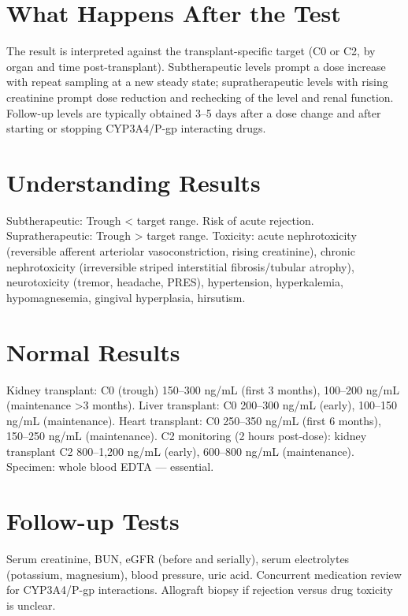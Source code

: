 \section*{What Happens After the Test}
The result is interpreted against the transplant-specific target (C0 or C2, by organ and time post-transplant). Subtherapeutic levels prompt a dose increase with repeat sampling at a new steady state; supratherapeutic levels with rising creatinine prompt dose reduction and rechecking of the level and renal function. Follow-up levels are typically obtained 3--5 days after a dose change and after starting or stopping CYP3A4/P-gp interacting drugs.

\section*{Understanding Results}
Subtherapeutic: Trough < target range. Risk of acute rejection. Supratherapeutic: Trough > target range. Toxicity: acute nephrotoxicity (reversible afferent arteriolar vasoconstriction, rising creatinine), chronic nephrotoxicity (irreversible striped interstitial fibrosis/tubular atrophy), neurotoxicity (tremor, headache, PRES), hypertension, hyperkalemia, hypomagnesemia, gingival hyperplasia, hirsutism.

\section*{Normal Results}
Kidney transplant: C0 (trough) 150--300 ng/mL (first 3 months), 100--200 ng/mL (maintenance >3 months). Liver transplant: C0 200--300 ng/mL (early), 100--150 ng/mL (maintenance). Heart transplant: C0 250--350 ng/mL (first 6 months), 150--250 ng/mL (maintenance). C2 monitoring (2 hours post-dose): kidney transplant C2 800--1,200 ng/mL (early), 600--800 ng/mL (maintenance). Specimen: whole blood EDTA --- essential.

\section*{Follow-up Tests}
Serum creatinine, BUN, eGFR (before and serially), serum electrolytes (potassium, magnesium), blood pressure, uric acid. Concurrent medication review for CYP3A4/P-gp interactions. Allograft biopsy if rejection versus drug toxicity is unclear.

